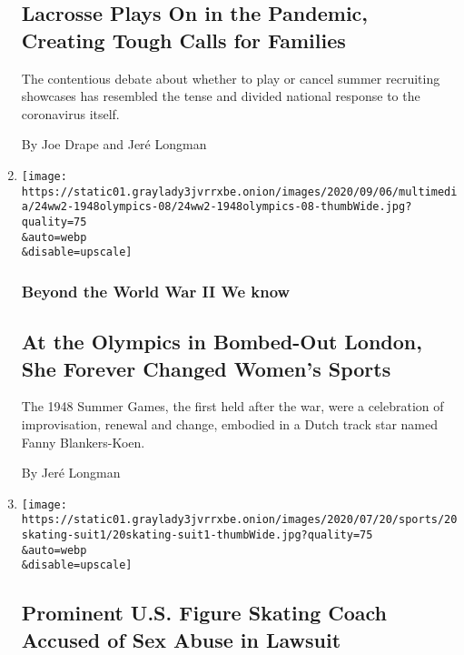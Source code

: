 \begin{enumerate}
{  \subsection{Lacrosse Plays On in the Pandemic, Creating Tough Calls
  for
  Families}\label{lacrosse-plays-on-in-the-pandemic-creating-tough-calls-for-families}}

  The contentious debate about whether to play or cancel summer
  recruiting showcases has resembled the tense and divided national
  response to the coronavirus itself.

  By Joe Drape and Jeré Longman
\item
  \href{/2020/07/24/magazine/1948-olympics-fanny-blankers-koen.html}{}

  \texttt{[image: https://static01.graylady3jvrrxbe.onion/images/2020/09/06/multimedia/24ww2-1948olympics-08/24ww2-1948olympics-08-thumbWide.jpg?quality=75\\\&auto=webp\\\&disable=upscale]}

  \hypertarget{beyond-the-world-war-ii-we-know}{%
  \subsubsection{Beyond the World War II We
  know}\label{beyond-the-world-war-ii-we-know}}

  \hypertarget{at-the-olympics-in-bombed-out-london-she-forever-changed-womens-sports}{%
  \subsection{At the Olympics in Bombed-Out London, She Forever Changed
  Women's
  Sports}\label{at-the-olympics-in-bombed-out-london-she-forever-changed-womens-sports}}

  The 1948 Summer Games, the first held after the war, were a
  celebration of improvisation, renewal and change, embodied in a Dutch
  track star named Fanny Blankers-Koen.

  By Jeré Longman
\item
  \href{/2020/07/20/sports/olympics/richard-callaghan-figure-skating-abuse.html}{}

  \texttt{[image: https://static01.graylady3jvrrxbe.onion/images/2020/07/20/sports/20skating-suit1/20skating-suit1-thumbWide.jpg?quality=75\\\&auto=webp\\\&disable=upscale]}

  \hypertarget{prominent-us-figure-skating-coach-accused-of-sex-abuse-in-lawsuit}{%
  \subsection{Prominent U.S. Figure Skating Coach Accused of Sex Abuse
  in
  Lawsuit}\label{prominent-us-figure-skating-coach-accused-of-sex-abuse-in-lawsuit}}


\end{enumerate}
